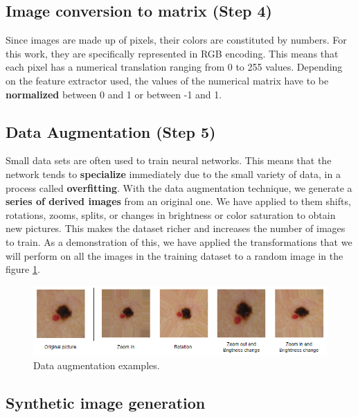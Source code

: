 \subsection{{Image conversion to matrix (Step 4)}}
Since images are made up of pixels, their colors are constituted by numbers. For this work,  they are specifically represented in RGB encoding. This means that each pixel has a numerical translation ranging from 0 to 255 values. Depending on the feature extractor used, the values of the numerical matrix have to be \textbf{normalized} between 0 and 1 or between -1 and 1. 

\subsection{{Data Augmentation (Step 5)}}
Small data sets are often used to train neural networks. This means that the network tends to \textbf{specialize} immediately due to the small variety of data, in a process called \textbf{overfitting}. With the data augmentation technique, we generate a \textbf{series of derived images} from an original one. We have applied to them shifts, rotations, zooms, splits, or changes in brightness or color saturation to obtain new pictures. This makes the dataset richer and increases the number of images to train. As a demonstration of this, we have applied the transformations that we will perform on all the images in the training dataset to a random image in the figure \ref{fig: Data augmentation examples}.

\begin{figure}[ht]
    \begin{center}
        \includegraphics[scale=0.8]{images/Building/Data augmentation.png}
        \caption{Data augmentation examples.}
    \label{fig: Data augmentation examples}    
    \end{center}
\end{figure}

\subsection{Synthetic image generation} 

